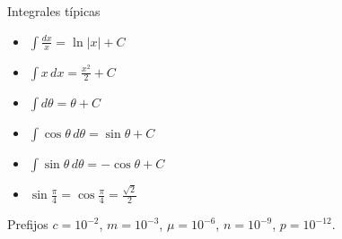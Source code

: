 \documentclass[addpoints,12pt]{exam}
\begin{document}
\begin{formbox}{Integrales t\'ipicas}
\noindent
\begin{minipage}{0.5\textwidth}
\begin{itemize}\setlength\itemsep{1pt}
    \item $\displaystyle\int \frac{dx}{x}=\ln|x|+C$
    \item $\displaystyle\int x\,dx=\frac{x^2}{2}+C$
    \item $\displaystyle\int d\theta=\theta+C$
\end{itemize}
\end{minipage}%
\begin{minipage}{0.48\textwidth}
\begin{itemize}\setlength\itemsep{1pt}
    \item $\displaystyle\int \cos\theta\,d\theta=\sin\theta+C$
    \item $\displaystyle\int \sin\theta\,d\theta=-\cos\theta+C$
    \item $\sin\tfrac{\pi}{4}=\cos\tfrac{\pi}{4}=\tfrac{\sqrt2}{2}$
\end{itemize}
\end{minipage}
\end{formbox}

\begin{formbox}{Prefijos}
$c=10^{-2}$, \quad $m=10^{-3}$, \quad $\mu=10^{-6}$, \quad $n=10^{-9}$, \quad $p=10^{-12}$.
\end{formbox}
\end{document}
